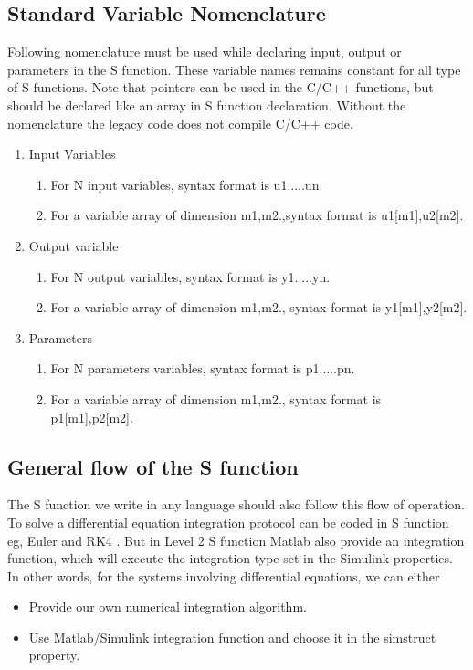 \documentclass{article}
\begin{document}
\subsection{Standard Variable Nomenclature}
Following nomenclature must be used while declaring input, output or parameters in the S function. These variable names remains constant for all type of S functions. Note that pointers can be used in the C/C++ functions, but should be declared like an array in S function declaration. Without the nomenclature the legacy code does not compile C/C++ code.
\begin{enumerate}
    \item Input Variables
    \begin{enumerate}
        \item For N input variables, syntax format is u1.....un.
        \item For a variable array of dimension m1,m2.,syntax format is u1[m1],u2[m2].
    \end{enumerate}
    \item Output variable
    \begin{enumerate}
        \item For N output variables, syntax format is y1.....yn.
        \item For a variable array of dimension m1,m2., syntax format is  y1[m1],y2[m2].
    \end{enumerate}
    \item Parameters
    \begin{enumerate}
        \item For N parameters variables, syntax format is p1.....pn.
        \item For a variable array of dimension m1,m2., syntax format is  p1[m1],p2[m2].
    \end{enumerate}
\end{enumerate}
\subsection{General flow of the S function}
The S function we write in any language should also follow this flow of operation. To solve a differential equation integration protocol can be coded in S function eg, Euler and RK4 . But in Level 2 S function Matlab also provide an integration function, which will execute the integration type set in the Simulink properties. In other words, for the systems involving differential equations, we can either 
\begin{itemize}
    \item Provide our own numerical integration algorithm.
    \item Use Matlab/Simulink integration function and choose it in the simstruct property.
\end{itemize}
\end{document}
